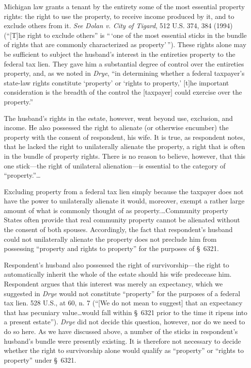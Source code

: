Michigan law grants a tenant by the entirety some of the most essential property
rights: the right to use the property, to receive income produced by it, and to
exclude others from it. \emph{See Dolan v. City of Tigard}, 512 U.S. 374, 384
(1994) (``[T]he right to exclude others'' is ``\,`one of the most essential
sticks in the bundle of rights that are commonly characterized as
property'\,''). These rights alone may be sufficient to subject the husband's
interest in the entireties property to the federal tax lien. They gave him a
substantial degree of control over the entireties property, and, as we noted in
\emph{Drye}, ``in determining whether a federal taxpayer's state-law rights
constitute `property' or `rights to property,' [t]he important consideration is
the breadth of the control the [taxpayer] could exercise over the property.''

The husband's rights in the estate, however, went beyond use, exclusion, and
income. He also possessed the right to alienate (or otherwise encumber) the
property with the consent of respondent, his wife. It is true, as respondent
notes, that he lacked the right to unilaterally alienate the property, a right
that is often in the bundle of property rights. There is no reason to believe,
however, that this one stick---the right of unilateral alienation---is
essential to the category of ``property.''\dots

Excluding property from a federal tax lien simply because the taxpayer does not
have the power to unilaterally alienate it would, moreover, exempt a rather
large amount of what is commonly thought of as property.\dots Community
property States often provide that real community property cannot be alienated
without the consent of both spouses. Accordingly, the fact that respondent's
husband could not unilaterally alienate the property does not preclude him from
possessing ``property and rights to property'' for the purposes of \S~6321.

Respondent's husband also possessed the right of survivorship---the right to
automatically inherit the whole of the estate should his wife predecease him.
Respondent argues that this interest was merely an expectancy, which we
suggested in \emph{Drye} would not constitute ``property'' for the purposes of a
federal tax lien. 528 U.S., at 60, n. 7 (``[We do not mean to suggest] that an
expectancy that has pecuniary value\dots would fall within \S~6321 prior
to the time it ripens into a present estate''). \emph{Drye} did not decide this
question, however, nor do we need to do so here. As we have discussed above, a
number of the sticks in respondent's husband's bundle were presently existing.
It is therefore not necessary to decide whether the right to survivorship alone
would qualify as ``property'' or ``rights to property'' under \S~6321.

